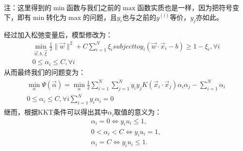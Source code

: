 \documentclass[a4paper,12pt]{article}
\begin{document}
注：这里得到的$\min$函数与我们之前的$\max$函数实质也是一样，因为把符号变下，即有$\min$转化为$\max$的问题，且$y_i$也与之前的$y^{(i)}$等价，$y_j$亦如此。

经过加入松弛变量后，模型修改为：
\begin{equation}
  \begin{split}
    \min_{\vec w,b,\vec \xi}\frac{1}{2}\|\vec w\|^2+C\sum_{i=1}^N\xi_i subject to y_i(\vec w \cdot \vec x_i -b)\geq 1-\xi_i,\forall i\\
    0\leq\alpha_i\leq C,\forall i
  \end{split}
\end{equation}
从而最终我们的问题变为：
\begin{equation}
  \begin{split}
    \begin{array}{c}
    \min_\alpha\Psi(\vec\alpha)=\min_\alpha\frac{1}{2}\sum_{i=1}^N\sum_{j=1}^Ny_iy_jK(\vec x_i\cdot \vec x_j)\alpha_i\alpha_j-\sum_{i=1}^N\alpha_i\\
    0\leq\alpha_i\leq C,\forall i
    \sum_{i=1}^Ny_i\alpha_i=0
  \end{array}
  \end{split}
\end{equation}
继而，根据KKT条件可以得出其中$\alpha_i$取值的意义为：
\begin{equation}
  \begin{split}
    \alpha_i=0 \Leftrightarrow y_iu_i\leq1,\\
    0<\alpha_i<C \Leftrightarrow y_iu_i=1,\\
    \alpha_i=C\Leftrightarrow y_iu_i\leq 1.
  \end{split}
\end{equation}
\end{document}
